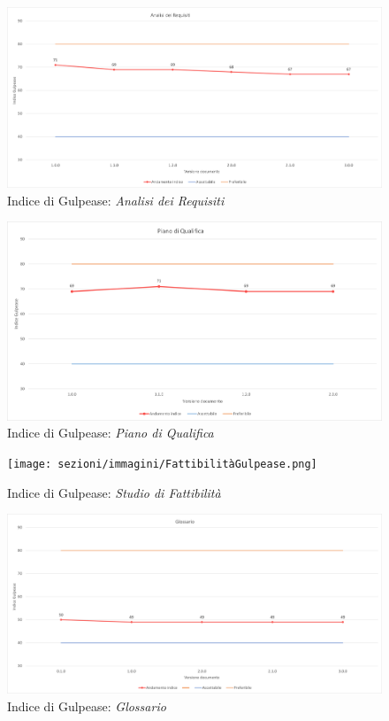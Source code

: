 \pagebreak
\begin{figure}[!ht]
    \caption{Indice di Gulpease: \textit{Analisi dei Requisiti}}
    \vspace{10px}
    \includegraphics[scale=0.5]{sezioni/immagini/AnalisiGulpease.png}
    \centering
\end{figure}
\begin{figure}[!ht]
    \caption{Indice di Gulpease: \textit{Piano di Qualifica}}
    \vspace{10px}
    \includegraphics[scale=0.5]{sezioni/immagini/PianoQualificaGulpease.png}
    \centering
\end{figure}
\pagebreak
\begin{figure}[!ht]
    \caption{Indice di Gulpease: \textit{Studio di Fattibilità}}
    \vspace{10px}
    \texttt{[image: sezioni/immagini/FattibilitàGulpease.png]}
    \centering
\end{figure}
\begin{figure}[!ht]
    \caption{Indice di Gulpease: \textit{Glossario}}
    \vspace{10px}
    \includegraphics[scale=0.5]{sezioni/immagini/GlossarioGulpease.png}
    \centering
\end{figure}
